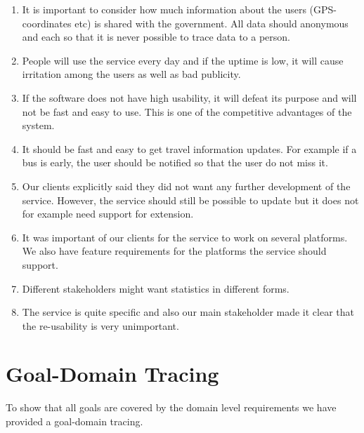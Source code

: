 \documentclass[a4paper]{article}
\begin{document}
		\begin{enumerate}
  			\item It is important to consider how much information about the users (GPS-coordinates etc) is shared with the government.	All data should anonymous and each so that it is never possible to trace data to a person.
  			\item People will use the service every day and if the uptime is low, it will cause irritation among the users as well as bad publicity.
  			\item If the software does not have high usability, it will defeat its purpose and will not be fast and easy to use. This is one of the competitive advantages of the system.
  			\item It should be fast and easy to get travel information updates. For example if a bus is early, the user should be notified so that the user do not miss it.
  			\item Our clients explicitly said they did not want any further development of the service. However, the service should still be possible to update but it does not for example need support for extension.
  			\item It was important of our clients for the service to work on several platforms. We also have feature requirements for the platforms the service should support.
  			\item Different stakeholders might want statistics in different forms.
  			\item The service is quite specific and also our main stakeholder made it clear that the re-usability is very unimportant.	
		\end{enumerate}

	
	\section{Goal-Domain Tracing}
	 To show that all goals are covered by the domain level requirements we have provided a goal-domain tracing. \\
				
		
	\newpage
\end{document}
